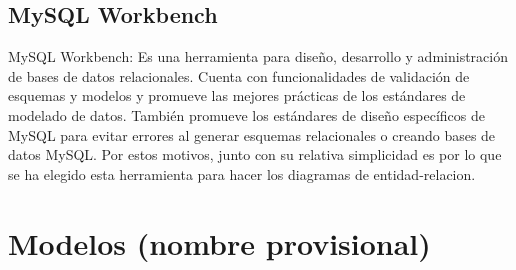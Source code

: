 \documentclass[11pt]{article}
\begin{document}
	\subsection{MySQL Workbench}
MySQL Workbench: Es una herramienta para diseño, desarrollo y administración de bases de datos relacionales. 
Cuenta con funcionalidades de validación de esquemas y modelos y promueve las mejores prácticas de los estándares de modelado de datos. También promueve los estándares de diseño específicos de MySQL para evitar errores al generar esquemas relacionales o creando bases de datos MySQL. Por estos motivos, junto con su relativa simplicidad es por lo que se ha elegido esta herramienta para hacer los diagramas de entidad-relacion.
	

\section{Modelos (nombre provisional)}
\end{document}
